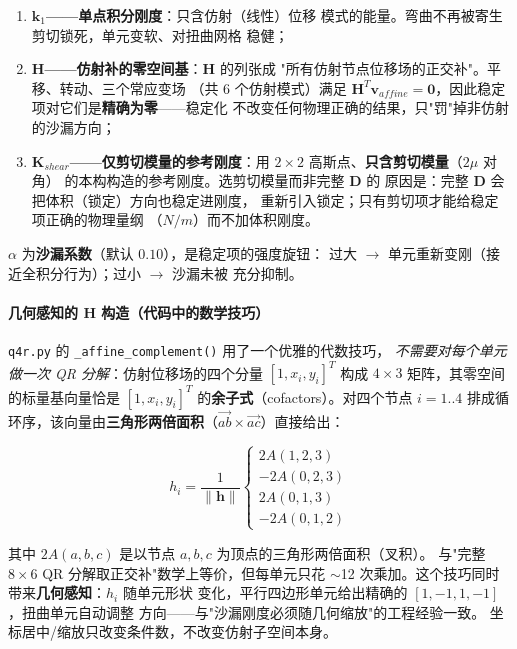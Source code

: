 \documentclass[12pt,a4paper]{ctexart}
\newcommand{\fem}{\Verb}
\begin{document}
\begin{enumerate}[leftmargin=*]
  \item \textbf{$\mathbf{k}_1$——单点积分刚度}：只含仿射（线性）位移
        模式的能量。弯曲不再被寄生剪切锁死，单元变软、对扭曲网格
        稳健；
  \item \textbf{$\mathbf{H}$——仿射补的零空间基}：$\mathbf{H}$ 的列张成
        "所有仿射节点位移场的正交补"。平移、转动、三个常应变场
        （共 6 个仿射模式）满足 $\mathbf{H}^T \mathbf{v}_{affine} =
        \mathbf{0}$，因此稳定项对它们是\textbf{精确为零}——稳定化
        不改变任何物理正确的结果，只"罚"掉非仿射的沙漏方向；
  \item \textbf{$\mathbf{K}_{shear}$——仅剪切模量的参考刚度}：用
        $2\times2$ 高斯点、\textbf{只含剪切模量}（$2\mu$ 对角）
        的本构构造的参考刚度。选剪切模量而非完整 $\mathbf{D}$ 的
        原因是：完整 $\mathbf{D}$ 会把体积（锁定）方向也稳定进刚度，
        重新引入锁定；只有剪切项才能给稳定项正确的物理量纲
        （$N/m$）而不加体积刚度。
\end{enumerate}

$\alpha$ 为\textbf{沙漏系数}（默认 $0.10$），是稳定项的强度旋钮：
过大 $\to$ 单元重新变刚（接近全积分行为）；过小 $\to$ 沙漏未被
充分抑制。

\paragraph{几何感知的 $\mathbf{H}$ 构造（代码中的数学技巧）}

\fem|q4r.py| 的 \fem|_affine_complement()| 用了一个优雅的代数技巧，
\emph{不需要对每个单元做一次 QR 分解}：仿射位移场的四个分量
$[1, x_i, y_i]^T$ 构成 $4\times3$ 矩阵，其零空间的标量基向量恰是
$[1, x_i, y_i]^T$ 的\textbf{余子式}（cofactors）。对四个节点
$i=1..4$ 排成循环序，该向量由\textbf{三角形两倍面积}（$\vec{ab} \times
\vec{ac}$）直接给出：

\begin{equation}
h_i = \frac{1}{\|\mathbf{h}\|} \begin{cases}
  2A(1,2,3) \\ -2A(0,2,3) \\ 2A(0,1,3) \\ -2A(0,1,2)
\end{cases}
\label{eq:q4r-cofactor}
\end{equation}

其中 $2A(a,b,c)$ 是以节点 $a,b,c$ 为顶点的三角形两倍面积（叉积）。
与"完整 $8\times6$ QR 分解取正交补"数学上等价，但每单元只花
$\sim$12 次乘加。这个技巧同时带来\textbf{几何感知}：$h_i$ 随单元形状
变化，平行四边形单元给出精确的 $[1,-1,1,-1]$，扭曲单元自动调整
方向——与"沙漏刚度必须随几何缩放"的工程经验一致。
坐标居中/缩放只改变条件数，不改变仿射子空间本身。
\end{document}
